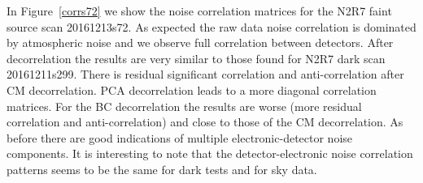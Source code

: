 In Figure~\ref{corrs72} we show the noise correlation matrices for the N2R7 faint source scan 20161213s72. As expected the raw data noise correlation is dominated by atmospheric noise and we observe full correlation between detectors. After decorrelation the results are very similar to those found for N2R7 dark scan 20161211s299. There is residual significant correlation and anti-correlation after CM decorrelation. PCA decorrelation leads to a more diagonal correlation matrices. For the BC decorrelation the results are worse (more residual correlation and anti-correlation) and close to those of the CM decorrelation. As before there are good indications of multiple electronic-detector noise components. It is interesting to note that the detector-electronic noise correlation patterns seems to be the same for dark tests and for sky data. 


